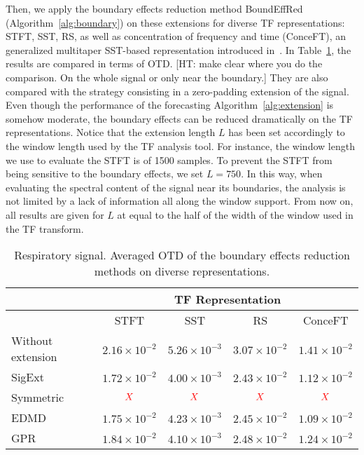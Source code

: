 Then, we apply the boundary effects reduction method {\sf BoundEffRed} (Algorithm~\ref{alg:boundary}) on these extensions for diverse TF representations: STFT, SST, RS, as well as concentration of frequency and time (ConceFT), an generalized multitaper SST-based representation introduced in~\cite{Daubechies16conceft}. In Table~\ref{tab:otd.tho}, the results are compared in terms of OTD. {\color{red}[HT: make clear where you do the comparison. On the whole signal or only near the boundary.]} They are also compared with the strategy consisting in a zero-padding extension of the signal. Even though the performance of the forecasting Algorithm~\ref{alg:extension} is somehow moderate, the boundary effects can be reduced dramatically on the TF representations. Notice that the extension length $L$ has been set accordingly to the window length used by the TF analysis tool. For instance, the window length we use to evaluate the STFT is of 1500 samples. To prevent the STFT from being sensitive to the boundary effects, we set $L=750$. In this way, when evaluating the spectral content of the signal near its boundaries, the analysis is not limited by a lack of information all along the window support. From now on, all results are given for $L$ at equal to the half of the width of the window used in the TF transform.  

\begin{table}
\centering
\caption{Respiratory signal. Averaged OTD of the boundary effects reduction methods on diverse representations.}
\begin{tabular}{|>{\centering}m{35pt}||c|c|c|c|}
  \hline
   \multirow{2}{35pt}{\centering Extension method} & \multicolumn{4}{c|}{TF Representation} \\
   \cline{2-5}
      & STFT & SST & RS & ConceFT \\
   \hhline{|=#=|=|=|=|}
   Without extension & $2.16\!\times\! 10^{-2}$ & $5.26\!\times\! 10^{-3}$ & $3.07\!\times\! 10^{-2}$ & $1.41\!\times\! 10^{-2}$ \\
   \hline
   {\sf SigExt} & $1.72\!\times\! 10^{-2}$ & $4.00\!\times\! 10^{-3}$ & $2.43\!\times\! 10^{-2}$ & $1.12\!\times\! 10^{-2}$ \\
   \hline
   Symmetric & ${\color{red}X}$ & ${\color{red}X}$ & ${\color{red}X}$ & ${\color{red}X}$\\
   \hline
   EDMD & $1.75\!\times\! 10^{-2}$ & $4.23\!\times\! 10^{-3}$ & $2.45\!\times\! 10^{-2}$ & $1.09\!\times\! 10^{-2}$ \\
   \hline
   GPR & $1.84\!\times\! 10^{-2}$ & $4.10\!\times\! 10^{-3}$ & $2.48\!\times\! 10^{-2}$ & $1.24\!\times\! 10^{-2}$ \\
   \hline
\end{tabular}
\label{tab:otd.tho}
\end{table}


